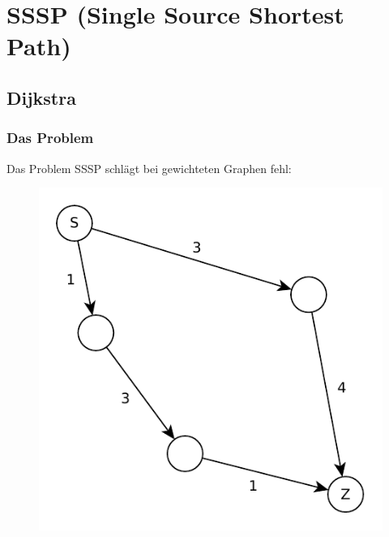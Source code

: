 \section{SSSP (Single Source Shortest Path)}
\subsection{Dijkstra}
\begin{frame}
\frametitle{Das Problem}
\begin{block}{Das Problem}
SSSP schlägt bei gewichteten Graphen fehl: 

\begin{figure}
\includegraphics[scale=.75]{dijkstra_graphs/bfs_fail_0.pdf}
\end{figure}

\end{block}
\end{frame}

